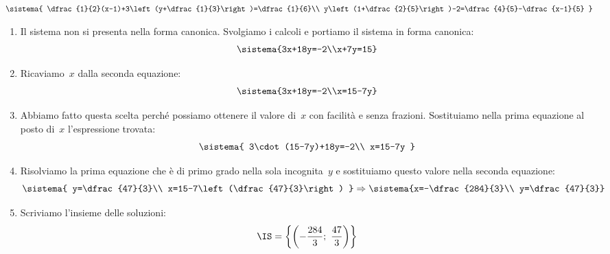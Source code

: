 \begin{esempio}{}{}
\(\sistema{
  \dfrac{1}{2}(x-1)+3\left(y+\dfrac{1}{3}\right)=\dfrac{1}{6}\\
  y\left(1+\dfrac{2}{5}\right)-2=\dfrac{4}{5}-\dfrac{x-1}{5}
  }\)

\begin{enumerate}
\item Il sistema non si presenta nella forma canonica. 
Svolgiamo i calcoli e portiamo il sistema in forma canonica:
\[\sistema{3x+18y=-2\\x+7y=15}\]

\item Ricaviamo~\(x\) dalla seconda equazione:
\[\sistema{3x+18y=-2\\x=15-7y}\]

\item Abbiamo fatto questa scelta perché possiamo ottenere il valore 
di~\(x\) con facilità e senza frazioni. 
Sostituiamo nella prima equazione al posto 
di~\(x\) l'espressione trovata:
\[\sistema{
          3\cdot(15-7y)+18y=-2\\
          x=15-7y
          }
\]
\item Risolviamo la prima equazione che è di primo grado nella sola
incognita~\(y\) e sostituiamo questo valore nella seconda equazione:
\[\sistema{
          y=\dfrac{47}{3}\\
          x=15-7\left(\dfrac{47}{3}\right)
          }
\Rightarrow \sistema{x=-\dfrac{284}{3}\\
 y=\dfrac{47}{3}}\]
\item Scriviamo l'insieme delle soluzioni:
\[\IS=\left\{\left(-\frac{284}{3};~\frac{47}{3}\right)\right\}\]
\end{enumerate}

 \end{esempio}
% 
% 
